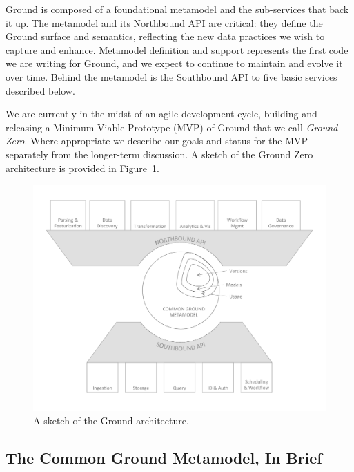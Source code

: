 Ground is composed of a foundational metamodel and the sub-services that back it up.  The metamodel and its Northbound API are critical: they define the Ground surface and semantics, reflecting the new data practices we wish to capture and enhance.  Metamodel definition and support represents the first code we are writing for Ground, and we expect to continue to maintain and evolve it over time.  Behind the metamodel is the Southbound API to five basic services described below.  

We are currently in the midst of an agile development cycle, building and releasing a Minimum Viable Prototype (MVP) of Ground that we call \emph{Ground Zero}. Where appropriate we describe our goals and status for the MVP separately from the longer-term discussion.  A sketch of the Ground Zero architecture is provided in Figure~\ref{fig:layers}.

\begin{figure}
\centering
\includegraphics[width=0.75\linewidth]{ground0fig.pdf}
\caption{A sketch of the Ground architecture.}
\label{fig:layers}
\end{figure}

\subsection{The Common Ground Metamodel, In Brief}


